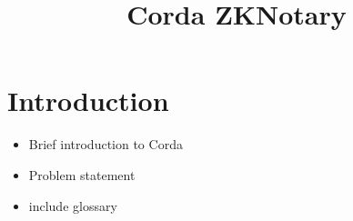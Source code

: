 \documentclass[a4paper,12pt,english]{memoir}
\title{Corda ZKNotary}
\begin{document}
\maketitle


\begin{abstract}

\end{abstract}

\chapter*{Introduction}

\begin{itemize}
\item Brief introduction to Corda
\item Problem statement
\end{itemize}







\begin{itemize}
\item include glossary
\end{itemize}

\appendix


\end{document}
